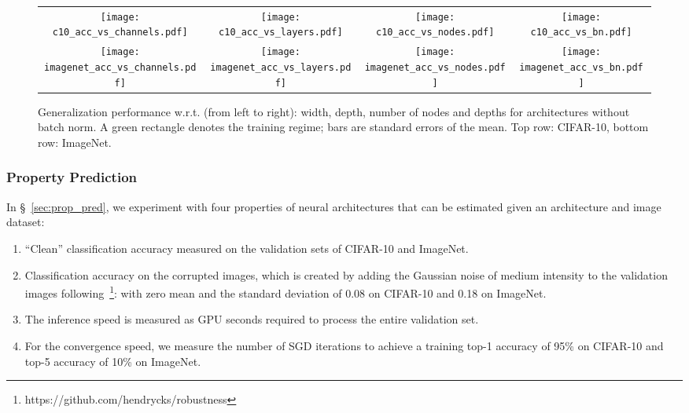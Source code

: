 \begin{figure}[tbhp]
	\centering
	\setlength{\tabcolsep}{1pt}
	\begin{tabular}{cccc}
		{\texttt{[image: c10\_acc\_vs\_channels.pdf]}} & \texttt{[image: c10\_acc\_vs\_layers.pdf]} &
		\texttt{[image: c10\_acc\_vs\_nodes.pdf]} &
		\texttt{[image: c10\_acc\_vs\_bn.pdf]} \\
		\texttt{[image: imagenet\_acc\_vs\_channels.pdf]} & \texttt{[image: imagenet\_acc\_vs\_layers.pdf]} &
		\texttt{[image: imagenet\_acc\_vs\_nodes.pdf]} &
		\texttt{[image: imagenet\_acc\_vs\_bn.pdf]} \\
	\end{tabular}
	\caption{Generalization performance w.r.t. (from left to right): width, depth, number of nodes and depths for architectures without batch norm. A green rectangle denotes the training regime; bars are standard errors of the mean. Top row: CIFAR-10, bottom row: ImageNet.}
	\label{fig:generalize_all}
\end{figure}



\subsubsection{Property Prediction\label{apdx:prop}}

In \S~\ref{sec:prop_pred}, we experiment with four properties of neural architectures that can be estimated given an architecture and image dataset:
\begin{enumerate}
	\item ``Clean'' classification accuracy measured on the validation sets of CIFAR-10 and ImageNet.
	\item Classification accuracy on the corrupted images, which is created by adding the Gaussian noise of medium intensity to the validation images following~\cite{hendrycks2019benchmarking}\footnote{https://github.com/hendrycks/robustness}: with zero mean and the standard deviation of 0.08 on CIFAR-10 and 0.18 on ImageNet.
	\item The inference speed is measured as GPU seconds required to process the entire validation set.
	\item For the convergence speed, we measure the number of SGD iterations to achieve a training top-1 accuracy of 95\% on CIFAR-10 and top-5 accuracy of 10\% on ImageNet.
\end{enumerate}

